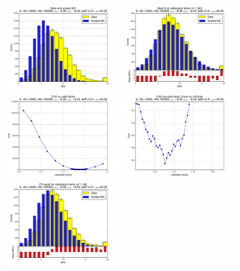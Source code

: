 
 \begin{figure}[htbp] \begin{center} 
\includegraphics[width=0.45\textwidth]{../FIGURES/06/FIG_Data_and_scaled_MC.pdf} 
\includegraphics[width=0.45\textwidth]{../FIGURES/06/FIG_Best_fit_at_calibration_factor_of_1_365.pdf} 
\includegraphics[width=0.45\textwidth]{../FIGURES/06/FIG_Chi2_vs_calib_factor.pdf} 
\includegraphics[width=0.45\textwidth]{../FIGURES/06/FIG_Chi2_vs_calib_factor_Zoom_on_chi2min.pdf} 
\includegraphics[width=0.45\textwidth]{../FIGURES/06/FIG_Fit_result_for_calibration_factor_of_1_180.pdf} 

\end{center}
\end{figure}
